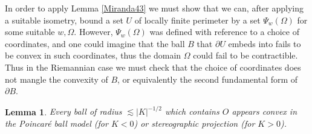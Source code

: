 \documentclass[reqno,11pt]{amsart}
\newtheorem{lemma}[theorem]{Lemma}
\theoremstyle{definition}
\numberwithin{equation}{section}
\begin{document}
In order to apply Lemma \ref{Miranda43} we must show that we can, after applying a suitable isometry, bound a set $U$ of locally finite perimeter by a set $\Psi_w(\Omega)$ for some suitable $w, \Omega$.
However, $\Psi_w(\Omega)$ was defined with reference to a choice of coordinates, and one could imagine that the ball $B$ that $\partial U$ embeds into fails to be convex in such coordinates, thus the domain $\Omega$ could fail to be contractible.
Thus in the Riemannian case we must check that the choice of coordinates does not mangle the convexity of $B$, or equivalently the second fundamental form of $\partial B$.

\begin{lemma}\label{convex balls}
Every ball of radius $\lesssim |K|^{-1/2}$ which contains $O$ appears convex in the Poincar\'e ball model (for $K < 0$) or stereographic projection (for $K > 0$).
\end{lemma}
\end{document}
